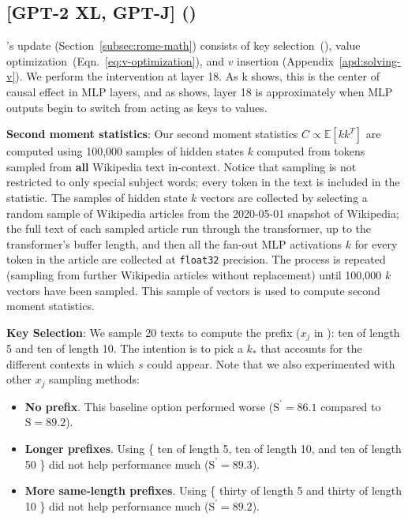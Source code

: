\subsection{[GPT-2 XL, GPT-J] \methodlong (\method)} \label{subapd:rome-hparams}

\method's update (Section~\ref{subsec:rome-math}) consists of key selection~(), value optimization~(Eqn.~\ref{eq:v-optimization}), and $v$ insertion (Appendix~\ref{apd:solving-v}). We perform the intervention at layer 18. As k shows, this is the center of causal effect in MLP layers, and as  shows, layer 18 is approximately when MLP outputs begin to switch from acting as keys to values.

\textbf{Second moment statistics}: Our second moment statistics $C \propto \mathbb{E}[kk^T]$ are computed using 100,000 samples of hidden states $k$ computed from tokens sampled from \textbf{all} Wikipedia text in-context.  Notice that sampling is not restricted to only special subject words; every token in the text is included in the statistic. The samples of hidden state $k$ vectors are collected by selecting a random sample of Wikipedia articles from the 2020-05-01 snapshot of Wikipedia; the full text of each sampled article run through the transformer, up to the transformer's buffer length, and then all the fan-out MLP activations $k$ for every token in the article are collected at \texttt{float32} precision.  The process is repeated (sampling from further Wikipedia articles without replacement) until 100{,}000 $k$ vectors have been sampled.  This sample of vectors is used to compute second moment statistics.

\textbf{Key Selection}: We sample 20 texts to compute the prefix ($x_j$ in ): ten of length 5 and ten of length 10. The intention is to pick a $k_*$ that accounts for the different contexts in which $s$ could appear. Note that we also experimented with other $x_j$ sampling methods:
\begin{itemize}[leftmargin=12pt,topsep=0pt,parsep=0pt,partopsep=0pt,itemsep=3pt]
    \item \textbf{No prefix}. This baseline option performed worse ($\mathrm{S}^\prime = 86.1$ compared to $\mathrm{S}=89.2$).
    \item \textbf{Longer prefixes}. Using \{ ten of length 5, ten of length 10, and ten of length 50 \} did not help performance much ($\mathrm{S}^\prime = 89.3$).
    \item \textbf{More same-length prefixes}. Using \{ thirty of length 5 and thirty of length 10 \} did not help performance much ($\mathrm{S}^\prime = 89.2$).
\end{itemize}

